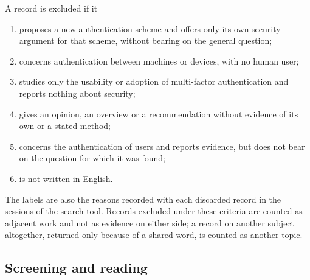A record is excluded if it
\begin{enumerate}[label=X\arabic*,ref=X\arabic*]
  \item\label{x:scheme} proposes a new authentication scheme and offers
    only its own security argument for that scheme, without bearing on
    the general question;
  \item\label{x:machine} concerns authentication between machines or
    devices, with no human user;
  \item\label{x:usability} studies only the usability or adoption of
    multi-factor authentication and reports nothing about security;
  \item\label{x:opinion} gives an opinion, an overview or a
    recommendation without evidence of its own or a stated method;
  \item\label{x:other} concerns the authentication of users and reports
    evidence, but does not bear on the question for which it was found;
  \item\label{x:english} is not written in English.
\end{enumerate}
The labels are also the reasons recorded with each discarded record in
the sessions of the search tool.
Records excluded under these criteria are counted as adjacent work and
not as evidence on either side; a record on another subject altogether,
returned only because of a shared word, is counted as another topic.

\subsection{Screening and reading}\label{sec:screening}

